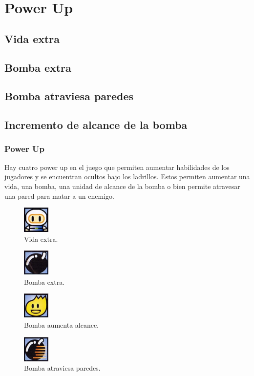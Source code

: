 \documentclass{beamer}
\begin{document}
\section{Power Up}
\subsection{Vida extra}
\subsection{Bomba extra}
\subsection{Bomba atraviesa paredes}
\subsection{Incremento de alcance de la bomba}
\begin{frame}
\frametitle{Power Up}
Hay cuatro power up en el juego que permiten aumentar habilidades de los jugadores y se encuentran ocultos bajo los ladrillos. Estos permiten aumentar una vida, una bomba, una unidad de alcance de la bomba o bien permite atravesar una pared para matar a un enemigo.

\begin{figure}[H]
	\centering
	\includegraphics[scale=0.2]{assets/powerups/vidaextra.png}
    \caption{Vida extra.}
    \label{fig:vida extra}
\end{figure} 

\begin{figure}[H]
	\centering
	\includegraphics[scale=0.2]{assets/powerups/bombaextra.png}
    \caption{Bomba extra.}
    \label{fig:bomba extra}
\end{figure} 

\begin{figure}[H]
	\centering
	\includegraphics[scale=0.2]{assets/powerups/bombamasgrande.png}
    \caption{Bomba aumenta alcance.}
    \label{fig:bomba aumenta alcance}
\end{figure} 

\begin{figure}[H]
	\centering
	\includegraphics[scale=0.2]{assets/powerups/bombaatraviesaparedes.png}
    \caption{Bomba atraviesa paredes.}
    \label{fig:bomba atraviesa paredes}
\end{figure} 

\end{frame}
\end{document}
